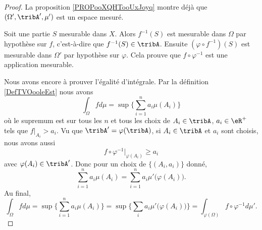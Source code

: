 \begin{proof}
	La proposition \ref{PROPooXQHTooUxJoyq} montre déjà que \( (\Omega',\tribA',\mu')\) est un espace mesuré.

	Soit une partie \( S\) mesurable dans \( X\). Alors \( f^{-1}(S)\) est mesurable dans \( \Omega\) par hypothèse sur \( f\), c'est-à-dire que \( f^{-1}(S)\in\tribA\). Ensuite \( (\varphi\circ f^{-1})(S)\) est mesurable dans \( \Omega'\) par hypothèse sur \( \varphi\). Cela prouve que \(  f\circ\varphi^{-1} \) est une application mesurable.

	Nous avons encore à prouver l'égalité d'intégrale. Par la définition \ref{DefTVOooleEst} nous avons
	\begin{equation}
		\int_{\Omega}fd\mu=\sup\{ \sum_{i=1}^na_i\mu(A_i) \}
	\end{equation}
	où le supremum est sur tous les \( n\) et tous les choix de \( A_i\in\tribA\), \( a_i\in\eR^+\) tels que \( f|_{A_i}>a_i\). Vu que \( \tribA'=\varphi(\tribA)\), si \( A_i\in \tribA\) et \( a_i\) sont choisis, nous avons aussi
	\begin{equation}
		f\circ\varphi^{-1}|_{\varphi(A_i)}\geq a_i
	\end{equation}
	avec \( \varphi(A_i)\in\tribA'\). Donc pour un choix de \( \{ (A_i,a_i) \}\) donné,
	\begin{equation}
		\sum_{i=1}^na_i\mu(A_i)=\sum_{i=1}^na_i\mu'\big( \varphi(A_i) \big).
	\end{equation}
	Au final,
	\begin{equation}
		\int_{\Omega}fd\mu=\sup\{ \sum_{i=1}^na_i\mu(A_i) \}=\sup\{ \sum_ia_i\mu'\big( \varphi(A_i) \big) \}=\int_{\varphi(\Omega)}f\circ\varphi^{-1}d\mu'.
	\end{equation}
\end{proof}

